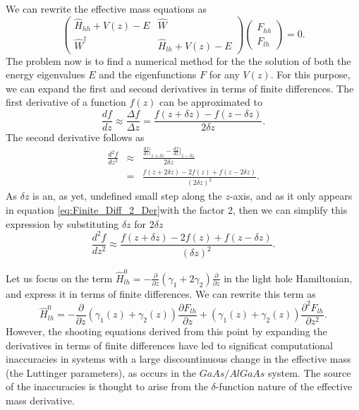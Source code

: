 We can rewrite the effective mass equations as \begin{equation}
\left(\begin{array}{cc}
\hat{H}_{hh}+V(z)-E & \hat{W}\\
\hat{W}^{\dagger} & \hat{H}_{lh}+V(z)-E\end{array}\right)\left(\begin{array}{c}
F_{hh}\\
F_{lh}\end{array}\right)=0.\end{equation}
The problem now is to find a numerical method for the the solution
of both the energy eigenvalues $E$ and the eigenfunctions $F$ for
any $V(z)$. For this purpose, we can expand the first and second
derivatives in terms of finite differences. The first derivative of
a function $f(z)$ can be approximated to \begin{equation}
\frac{df}{dz}\approx\frac{\Delta f}{\Delta z}=\frac{f(z+\delta z)-f(z-\delta z)}{2\delta z}.\label{eq:Finite_Dif_1_Der}\end{equation}
The second derivative follows as \begin{eqnarray}
\frac{d^{2}f}{dz^{2}} & \approx & \frac{\left.\frac{df}{dz}\right|_{z+\delta z}-\left.\frac{df}{dz}\right|_{z-\delta z}}{2\delta z}\nonumber \\
 & = & \frac{f(z+2\delta z)-2f(z)+f(z-2\delta z)}{(2\delta z)^{2}}.\label{eq:Finite_Diff_2_Der}\end{eqnarray}
As $\delta z$ is an, as yet, undefined small step along the $z$-axis,
and as it only appears in equation \ref{eq:Finite_Diff_2_Der}with
the factor 2, then we can simplify this expression by substituting
$\delta z$ for $2\delta z$\begin{equation}
\frac{d^{2}f}{dz^{2}}\approx\frac{f(z+\delta z)-2f(z)+f(z-\delta z)}{(\delta z)^{2}}.\end{equation}


Let us focus on the term $\hat{H}_{lh}^{0}=-\frac{\partial}{\partial z}\left(\gamma_{1}+2\gamma_{2}\right)\frac{\partial}{\partial z}$
in the light hole Hamiltonian, and express it in terms of finite differences.
We can rewrite this term as\begin{equation}
\hat{H}_{lh}^{0}=-\frac{\partial}{\partial z}\left(\gamma_{1}(z)+\gamma_{2}(z)\right)\frac{\partial F_{lh}}{\partial z}+\left(\gamma_{1}(z)+\gamma_{2}(z)\right)\frac{\partial^{2}F_{lh}}{\partial z^{2}}.\end{equation}
However, the shooting equations derived from this point by expanding
the derivatives in terms of finite differences have led to significat
computational inaccuracies in systems with a large discountinuous
change in the effective mass (the Luttinger parameters), as occurs
in the $GaAs/AlGaAs$ system. The source of the inaccuracies is thought
to arise from the $\delta$-function nature of the effective mass
derivative.

